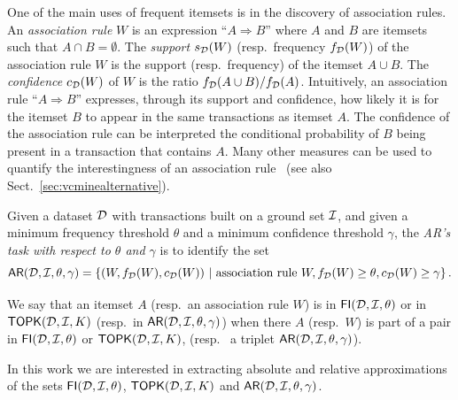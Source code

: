 One of the main uses of frequent itemsets is in the discovery of
association rules.
An \emph{association rule} $W$ is an expression
  ``$A\Rightarrow B$'' where $A$ and $B$ are itemsets such that $A\cap
  B=\emptyset$. The \emph{support} $s_{\cal D}(W)$ (resp.~frequency $f_{\cal D}(W)$)
  of the association rule $W$ is the support (resp.~frequency) of the itemset
  $A\cup B$. The \emph{confidence} $c_{\cal D}(W)$ of $W$ is the ratio $f_{\cal D}(A \cup
  B)/f_{\cal D}(A)$. %
Intuitively, an association rule ``$A\Rightarrow B$'' expresses, through its
support and confidence, how likely it is for the itemset $B$ to appear in the
same transactions as itemset $A$. The confidence of the association rule
can be interpreted the conditional probability of $B$ being present in a transaction that 
contains $A$. Many other measures can be used to quantify the interestingness of
an association rule~\citep{TanKS04} (see also Sect.~\ref{sec:vcminealternative}).

\begin{definition}\label{def:vcmineminear}
  Given a dataset ${\cal D}$ with transactions
  built on a ground set ${\cal I}$, and given a minimum frequency threshold $\theta$
  and a minimum confidence threshold $\gamma$, the \emph{AR's task with respect
  to $\theta$ and $\gamma$} is to identify the set
  \[
  \mathsf{AR}({\cal D},{\cal I},\theta,\gamma)=\left\{(W,f_{\cal D}(W),c_{\cal D}(W)) ~|~ \mbox{association rule } W,
  f_{\cal D}(W)\ge\theta, c_{\cal D}(W)\ge\gamma\right\}.\]
\end{definition}

We say that an itemset $A$ (resp.~an
association rule $W$) is in $\mathsf{FI}({\cal D},{\cal I},\theta)$ or in $\mathsf{TOPK}({\cal D},{\cal I},K)$
(resp.~in $\mathsf{AR}({\cal D},{\cal I},\theta,\gamma)$) 
when there $A$ (resp.~$W$) is part of a pair in $\mathsf{FI}({\cal D},{\cal I},\theta)$ or
$\mathsf{TOPK}({\cal D},{\cal I},K)$, (resp.~ a triplet $\mathsf{AR}({\cal D},{\cal I},\theta,\gamma)$).

In this work we are interested in extracting absolute and relative
approximations of the sets $\mathsf{FI}({\cal D},{\cal I},\theta)$, $\mathsf{TOPK}({\cal D},{\cal I},K)$ and
$\mathsf{AR}({\cal D},{\cal I},\theta,\gamma)$. 

